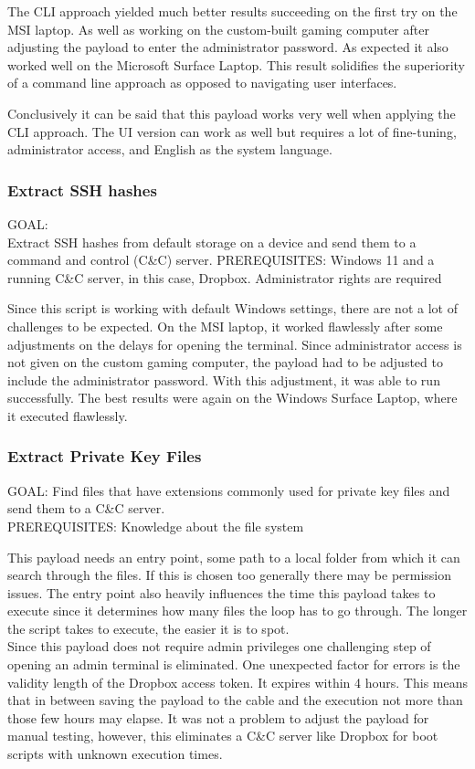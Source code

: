 The CLI approach yielded much better results succeeding on the first try on the MSI laptop. As well as working on the custom-built gaming computer after adjusting the payload to enter the administrator password. As expected it also worked well on the Microsoft Surface Laptop. This result solidifies the superiority of a command line approach as opposed to navigating user interfaces. 


Conclusively it can be said that this payload works very well when applying the CLI approach. The UI version can work as well but requires a lot of fine-tuning, administrator access, and English as the system language. 



\subsubsection{Extract SSH hashes}

GOAL:\\ Extract SSH hashes from default storage on a device and send them to a command and control (C\&C) server.
PREREQUISITES: Windows 11 and a running C\&C server, in this case, Dropbox. Administrator rights are required

Since this script is working with default Windows settings, there are not a lot of challenges to be expected. On the MSI laptop, it worked flawlessly after some adjustments on the delays for opening the terminal. Since administrator access is not given on the custom gaming computer, the payload had to be adjusted to include the administrator password. With this adjustment, it was able to run successfully. The best results were again on the Windows Surface Laptop, where it executed flawlessly. 


\subsubsection{Extract Private Key Files}

GOAL: Find files that have extensions commonly used for private key files and send them to a C\&C server. \\
PREREQUISITES: Knowledge about the file system

This payload needs an entry point, some path to a local folder from which it can search through the files. If this is chosen too generally there may be permission issues. The entry point also heavily influences the time this payload takes to execute since it determines how many files the loop has to go through. The longer the script takes to execute, the easier it is to spot. \\
Since this payload does not require admin privileges one challenging step of opening an admin terminal is eliminated. One unexpected factor for errors is the validity length of the Dropbox access token. It expires within 4 hours. This means that in between saving the payload to the cable and the execution not more than those few hours may elapse. It was not a problem to adjust the payload for manual testing, however, this eliminates a C\&C server like Dropbox for boot scripts with unknown execution times. \\

